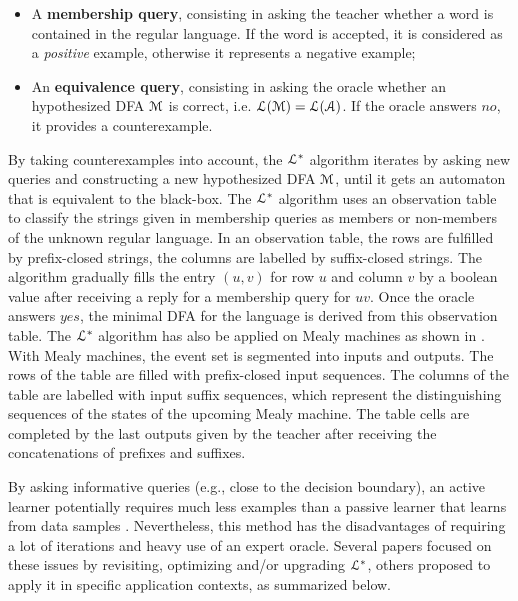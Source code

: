 \begin{itemize}
    \item A \textbf{membership query}, consisting in asking the
        teacher whether a word is contained in the regular
        language.  If the word is accepted, it is considered as a
        \textit{positive} example, otherwise it represents a
        negative example;

    \item An \textbf{equivalence query}, consisting in asking the
        oracle whether an hypothesized DFA $\EuScript{M}$ is
        correct, i.e. $\EuScript{L}(\EuScript{M}) =
        \EuScript{L}(\EuScript{A})$. If the oracle answers $no$,
        it provides a counterexample.
\end{itemize}

By taking counterexamples into account, the $\EuScript{L}^*$
algorithm iterates by asking new queries and constructing a new
hypothesized DFA $\EuScript{M}$, until it gets an automaton that
is equivalent to the black-box. The $\EuScript{L}^*$ algorithm
uses an observation table to classify the strings given in
membership queries as members or non-members of the unknown
regular language. In an observation table, the rows are fulfilled
by prefix-closed strings, the columns are labelled by
suffix-closed strings. The algorithm gradually fills the entry
$(u,v)$ for row $u$ and column $v$ by a boolean value after
receiving a reply for a membership query for $uv$. Once the
oracle answers $yes$, the minimal DFA for the language is derived
from this observation table. The $\EuScript{L}^*$
algorithm has also be applied on Mealy machines as shown in
\cite{DBLP:phd/de/Niese2003,steffen11}. With Mealy machines, the
event set is segmented into inputs and outputs. The rows of the
table are filled with prefix-closed input sequences. The columns
of the table are labelled with input suffix sequences, which
represent the distinguishing sequences of the states of the
upcoming Mealy machine. The table cells are completed by the last
outputs given by the teacher after receiving the concatenations
of prefixes and suffixes.

By asking informative queries (e.g., close to the decision
boundary), an active learner potentially requires much less
examples than a passive learner that learns from data samples
\cite{settles.tr09}. Nevertheless, this method has the
disadvantages of requiring a lot of iterations and heavy use of
an expert oracle. Several papers focused on these issues by
revisiting, optimizing and/or upgrading $\EuScript{L}^*$, others
proposed to apply it in specific application contexts, as
summarized below.

